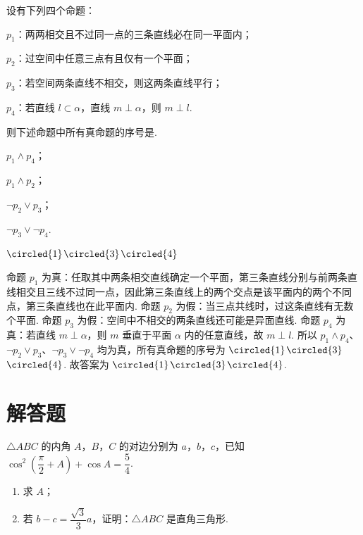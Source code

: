\begin{problem}
设有下列四个命题：

\begin{circlelist}
\item \(p_1\)：两两相交且不过同一点的三条直线必在同一平面内；
\item \(p_2\)：过空间中任意三点有且仅有一个平面；
\item \(p_3\)：若空间两条直线不相交，则这两条直线平行；
\item \(p_4\)：若直线 \(l\subset \alpha\)，直线 \(m\perp \alpha\)，则 \(m\perp l\).
\end{circlelist}

则下述命题中所有真命题的序号是\fillinblank{}.

\begin{circlelist}
    \item \(p_1\land p_4\)；
    \item \(p_1\land p_2\)；
    \item \(\neg p_2\vee p_3\)；
    \item \(\neg p_3\vee \neg p_4\).
\end{circlelist}
\end{problem}

\begin{answer}
\(\circled{1}\)\(\circled{3}\)\(\circled{4}\)
\end{answer}

\begin{solution}
命题 \(p_1\) 为真：任取其中两条相交直线确定一个平面，第三条直线分别与前两条直线相交且三线不过同一点，因此第三条直线上的两个交点是该平面内的两个不同点，第三条直线也在此平面内. 命题 \(p_2\) 为假：当三点共线时，过这条直线有无数个平面. 命题 \(p_3\) 为假：空间中不相交的两条直线还可能是异面直线. 命题 \(p_4\) 为真：若直线 \(m\perp\alpha\)，则 \(m\) 垂直于平面 \(\alpha\) 内的任意直线，故 \(m\perp l\). 所以 \(p_1\land p_4\)、\(\neg p_2\vee p_3\)、\(\neg p_3\vee\neg p_4\) 均为真，所有真命题的序号为 \(\circled{1}\)\(\circled{3}\)\(\circled{4}\). 故答案为 \(\circled{1}\)\(\circled{3}\)\(\circled{4}\).
\end{solution}

\section{解答题}

\begin{problem}
\(\triangle ABC\) 的内角 \(A\)，\(B\)，\(C\) 的对边分别为 \(a\)，\(b\)，\(c\)，已知 \(\cos^2\left( \dfrac{\pi}{2}+A \right)+\cos A=\dfrac{5}{4}\).

\begin{enumerate}
\item 求 \(A\)；
\item 若 \(b-c=\dfrac{\sqrt3}{3}a\)，证明：\(\triangle ABC\) 是直角三角形.
\end{enumerate}
\end{problem}

